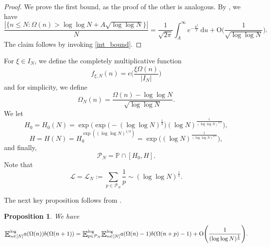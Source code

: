 \documentclass[letter,11pt]{article}
\theoremstyle{plain} %
\newtheorem{proposition}[theorem]{Proposition}
\theoremstyle{definition} %
\theoremstyle{plain}
\theoremstyle{plain}
\theoremstyle{plain}
\numberwithin{equation}{section}
\newcommand{\Oh}{{\mathrm O}}
\renewcommand{\leq}{\leqslant}
\renewcommand{\P}{\mathbb{P}}
\renewcommand{\d}{~\mathrm{d}}
\newcommand{\E}{\raisebox{-0.4ex}{\scalebox{1.4}[1.3]{$\mathbb{E}$}}}
\newcommand{\logE}{{\E}^{\log}}
\newcommand{\1}{\mathbbm{1}}
\newcommand{\f}{f_{\xi,N}}
\newcommand{\Pc}{\mathcal{P}}
\begin{document}
\begin{proof}
We prove the first bound, as the proof of the other is analogous.
By \cite[Theorem 2]{renyi-turan}, we have
$$\frac{|\{n\leq N\colon \Omega(n)>\log\log{N}+A\sqrt{\log\log{N}}\}|}{N}
= \frac{1}{\sqrt{2\pi}}\int_A^\infty e^{-\frac{u^2}{2}}\d u + \Oh\bigg(\frac{1}{\sqrt{\log\log{N}}}\bigg).$$
The claim follows by invoking \cref{int_bound}.
\end{proof}

For $\xi\in I_N$, we define the completely multiplicative function 
\begin{equation}\label{defn_f}
    \f(n) = e\bigg(\frac{\xi\Omega(n)}{|I_N|}\bigg)
\end{equation}
and for simplicity, we define
$$\Omega_N(n) = \frac{\Omega(n)-\log\log{N}}{\sqrt{\log\log{N}}}.$$
We let
\begin{equation}\label{defn_H0}
    H_0 = H_0(N) = \exp\Big(\exp\big(-(\log\log{N})^{\frac{1}{3}}\big)(\log{N})^\frac{1}{(\log\log{N})^{4/9}}\Big),
\end{equation}
\begin{equation}\label{defn_H}
    H = H(N) = H_0^{\exp((\log\log{N})^{1/3})}
    = \exp\Big((\log{N})^\frac{1}{(\log\log{N})^{4/9}}\Big),
\end{equation}
and finally,
\begin{equation}\label{defn_P}
    \Pc_N = \P\cap[H_0,H].
\end{equation}
Note that
\begin{equation}\label{eqn_L}
    \mathscr{L} = \mathscr{L}_N := \sum_{p\in\Pc_N}\frac{1}{p} \sim (\log\log{N})^\frac{1}{3}.
\end{equation}

The next key proposition follows from \cite[Corollary 1.4]{helf_radz}.
\begin{proposition}\label{Helf-Radz_cor}
    We have
    \begin{equation*}
        \logE_{n\in[N]} a(\Omega(n))b(\Omega(n+1))
        = \logE_{p\in\Pc_N}\logE_{n\in[N]} a(\Omega(n)-1)b(\Omega(n+p)-1) + \Oh\Bigg(\frac{1}{(\log\log{N})^\frac{1}{6}}\Bigg).
    \end{equation*}
\end{proposition}
\end{document}
